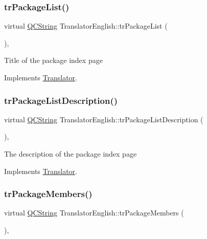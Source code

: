\subsubsection{\texorpdfstring{trPackageList()}{trPackageList()}}
{\footnotesize\ttfamily virtual \mbox{\hyperlink{class_q_c_string}{Q\+C\+String}} Translator\+English\+::tr\+Package\+List (\begin{DoxyParamCaption}{ }\end{DoxyParamCaption})\hspace{0.3cm}{\ttfamily [inline]}, {\ttfamily [virtual]}}

Title of the package index page 

Implements \mbox{\hyperlink{class_translator}{Translator}}.

\mbox{\label{class_translator_english_a1ecfc7dbe55cc35ee66ed64e3d9b9729}} 
\subsubsection{\texorpdfstring{trPackageListDescription()}{trPackageListDescription()}}
{\footnotesize\ttfamily virtual \mbox{\hyperlink{class_q_c_string}{Q\+C\+String}} Translator\+English\+::tr\+Package\+List\+Description (\begin{DoxyParamCaption}{ }\end{DoxyParamCaption})\hspace{0.3cm}{\ttfamily [inline]}, {\ttfamily [virtual]}}

The description of the package index page 

Implements \mbox{\hyperlink{class_translator}{Translator}}.

\mbox{\label{class_translator_english_a48b29d0a5e9bdd83a4dedb5c225205a1}} 
\subsubsection{\texorpdfstring{trPackageMembers()}{trPackageMembers()}}
{\footnotesize\ttfamily virtual \mbox{\hyperlink{class_q_c_string}{Q\+C\+String}} Translator\+English\+::tr\+Package\+Members (\begin{DoxyParamCaption}{ }\end{DoxyParamCaption})\hspace{0.3cm}{\ttfamily [inline]}, {\ttfamily [virtual]}}

